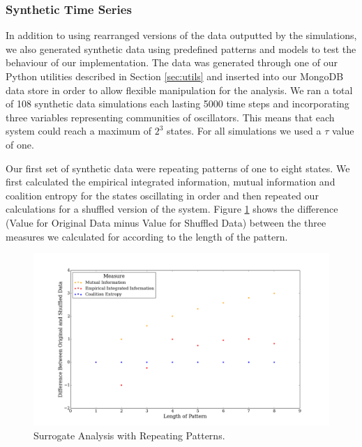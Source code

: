 \documentclass[a4paper,11pt]{article}
\begin{document}
\subsubsection{Synthetic Time Series}
\label{sec:app:osc:surrogate:synthetic}

In addition to using rearranged versions of the data outputted by the simulations, we also generated synthetic data using predefined patterns and models to test the behaviour of our implementation. The data was generated through one of our Python utilities described in Section \ref{sec:utils} and inserted into our MongoDB data store in order to allow flexible manipulation for the analysis. We ran a total of 108 synthetic data simulations each lasting 5000 time steps and incorporating three variables representing communities of oscillators. This means that each system could reach a maximum of $2^3$ states. For all simulations we used a $\tau$ value of one.

Our first set of synthetic data were repeating patterns of one to eight states. We first calculated the empirical integrated information, mutual information and coalition entropy for the states oscillating in order and then repeated our calculations for a shuffled version of the system. Figure \ref{fig:synth_difference_shuffled} shows the difference (Value for Original Data minus Value for Shuffled Data) between the three measures we calculated for according to the length of the pattern.

\begin{figure}[H]
	\begin{center}
		\includegraphics[scale = 0.35]{figures/synth_difference_shuffled}
		\caption{
			Surrogate Analysis with Repeating Patterns.
			\label{fig:synth_difference_shuffled}
		}
	\end{center}
\end{figure}
\end{document}
